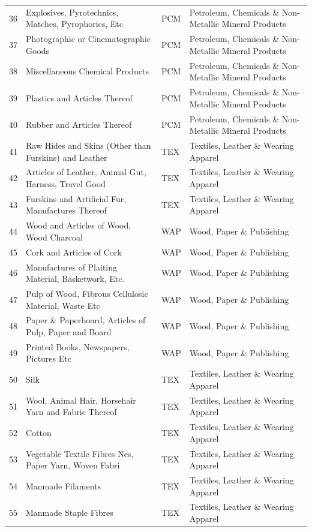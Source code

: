\documentclass[a4paper]{article}
\begin{document}
\begin{table}[ht]
{\begin{tabular}{rlll}
  36 & Explosives, Pyrotechnics, Matches, Pyrophorics, Etc & PCM & Petroleum, Chemicals \& Non-Metallic Mineral Products \\ 
  37 & Photographic or Cinematographic Goods & PCM & Petroleum, Chemicals \& Non-Metallic Mineral Products \\ 
  38 & Miscellaneous Chemical Products & PCM & Petroleum, Chemicals \& Non-Metallic Mineral Products \\ 
  39 & Plastics and Articles Thereof & PCM & Petroleum, Chemicals \& Non-Metallic Mineral Products \\ 
  40 & Rubber and Articles Thereof & PCM & Petroleum, Chemicals \& Non-Metallic Mineral Products \\ 
  41 & Raw Hides and Skins (Other than Furskins) and Leather & TEX & Textiles, Leather \& Wearing Apparel \\ 
  42 & Articles of Leather, Animal Gut, Harness, Travel Good & TEX & Textiles, Leather \& Wearing Apparel \\ 
  43 & Furskins and Artificial Fur, Manufactures Thereof & TEX & Textiles, Leather \& Wearing Apparel \\ 
  44 & Wood and Articles of Wood, Wood Charcoal & WAP & Wood, Paper \& Publishing \\ 
  45 & Cork and Articles of Cork & WAP & Wood, Paper \& Publishing \\ 
  46 & Manufactures of Plaiting Material, Basketwork, Etc. & WAP & Wood, Paper \& Publishing \\ 
  47 & Pulp of Wood, Fibrous Cellulosic Material, Waste Etc & WAP & Wood, Paper \& Publishing \\ 
  48 & Paper \& Paperboard, Articles of Pulp, Paper and Board & WAP & Wood, Paper \& Publishing \\ 
  49 & Printed Books, Newspapers, Pictures Etc & WAP & Wood, Paper \& Publishing \\ 
  50 & Silk & TEX & Textiles, Leather \& Wearing Apparel \\ 
  51 & Wool, Animal Hair, Horsehair Yarn and Fabric Thereof & TEX & Textiles, Leather \& Wearing Apparel \\ 
  52 & Cotton & TEX & Textiles, Leather \& Wearing Apparel \\ 
  53 & Vegetable Textile Fibres Nes, Paper Yarn, Woven Fabri & TEX & Textiles, Leather \& Wearing Apparel \\ 
  54 & Manmade Filaments & TEX & Textiles, Leather \& Wearing Apparel \\ 
  55 & Manmade Staple Fibres & TEX & Textiles, Leather \& Wearing Apparel \\ 

\end{tabular}}
\end{table}
\end{document}

